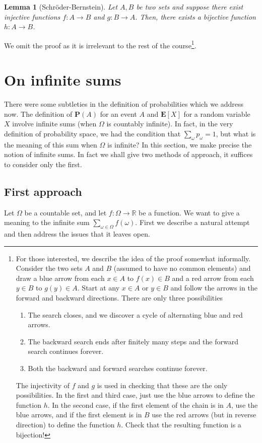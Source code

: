 \documentclass[preprint,  11pt]{amsart}
\theoremstyle{plain} %
\newtheorem{lemma}[theorem]{Lemma}
\theoremstyle{definition} %
\begin{document}
\begin{lemma}[Schr\"{o}der-Bernstein] Let $A,B$ be two sets and suppose there exist injective functions $f:A\rightarrow B$ and $g:B\rightarrow A$. Then, there exists a bijective function $h:A\rightarrow B$.
\end{lemma}
We omit the proof as it is irrelevant to the rest of the course\footnote{For those interested, we describe the idea of the proof somewhat informally. Consider the two sets $A$ and $B$ (assumed to have no common elements) and draw a blue arrow from each $x\in A$ to $f(x)\in B$ and a red arrow from each $y\in B$ to $g(y)\in A$. Start at any $x\in A$ or $y\in B$ and follow the arrows in the forward and backward directions. There are only three possibilities
\begin{enumerate}\setlength\itemsep{6pt}
\item The search closes, and we discover a cycle of alternating blue and red arrows.
\item The backward search ends after finitely many steps and the forward search continues forever.
\item Both the backward and forward searches continue forever.
\end{enumerate}
The injectivity of $f$ and $g$ is used in checking that these are the only possibilities. In the first and third case, just use the blue arrows to define the function $h$. In the second case, if the first element of the chain is in $A$, use the blue arrows, and if the first element is in $B$ use the red arrows (but in reverse direction) to define the function $h$. Check that the resulting function is a bijection!}.

\section{On infinite sums} There were some subtleties in the definition of probabilities which we address now. The definition of $\mathbf{P}(A)$ for an event $A$ and $\mathbf{E}[X]$ for a random variable $X$ involve infinite sums (when $\Omega$ is countably infinite). In fact, in the very definition of probability space, we had the condition that $\sum_{\omega}p_{\omega}=1$, but what is the meaning of this sum when $\Omega$ is infinite? In this section, we make precise the notion of infinite sums. In fact we shall give two methods of approach, it suffices to consider only the first.

\subsection{First approach} Let $\Omega$ be a countable set, and let $f:\Omega\rightarrow \mathbb{R}$ be a function. We want to give a meaning to the infinite sum $\sum_{\omega\in \Omega}f(\omega)$. First we describe a natural attempt and then address the issues that it leaves open.
\end{document}
